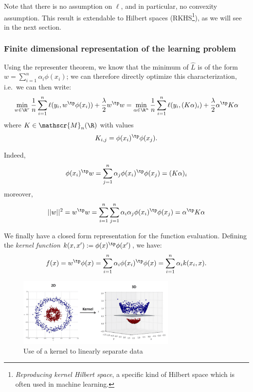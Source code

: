 \documentclass[toc, titlepaged]{../cs-classes/cs-classes}
\begin{document}
Note that there is no assumption on $\ell$, and in particular, no convexity assumption. This result is extendable to Hilbert spaces (RKHS\footnote{\emph{Reproducing kernel Hilbert space}, a specific kind of Hilbert space which is often used in machine learning.}), as we will see in the next section.

\subsubsection{Finite dimensional representation of the learning problem}
Using the representer theorem, we know that the minimum of $\hat{L}$ is of the form $w=\sum_{i=1}^n \alpha_i\phi(x_i)$; we can therefore directly optimize this characterization, i.e.~we can then write:
\begin{equation*}
    \min_{w\in\R^r} \frac{1}{n} \sum_{i=1}^n \ell(y_i, w^\tp\phi(x_i)) + \frac{\lambda}{2} w^\tp w = \min_{\alpha\in\R^n} \frac{1}{n}\sum_{i=1}^n \ell(y_i, (K\alpha)_i) + \frac{\lambda}{2}\alpha^\tp K\alpha
\end{equation*}
where $K\in\mathscr{M}_n(\R)$ with values
\begin{equation*}
    K_{i, j} = \phi(x_i)^\tp \phi(x_j).
\end{equation*}

Indeed,
\begin{equation*}
    \phi(x_i)^\tp w = \sum_{j=1}^n \alpha_j\phi(x_i)^\tp\phi(x_j) = (K\alpha)_i
\end{equation*}
moreover,
\begin{equation*}
    ||w||^2 = w^\tp w = \sum_{i=1}^n\sum_{j=1}^n \alpha_i\alpha_j\phi(x_i)^\tp\phi(x_j) = \alpha^\tp K\alpha
\end{equation*}

We finally have a closed form representation for the function evaluation. Defining the \emph{kernel function} $k(x, x'):=\phi(x)^\tp \phi(x')$, we have:
\begin{equation*}
    f(x) = w^\tp\phi(x) = \sum_{i=1}^n \alpha_i\phi(x_i)^\tp\phi(x) = \sum_{i=1}^n \alpha_i k(x_i, x).
\end{equation*}

\begin{figure}[H]
    \centering
    \includegraphics[width=0.7\textwidth]{images/kernel-trick.png}
    \caption{Use of a kernel to linearly separate data}
\end{figure}
\end{document}
